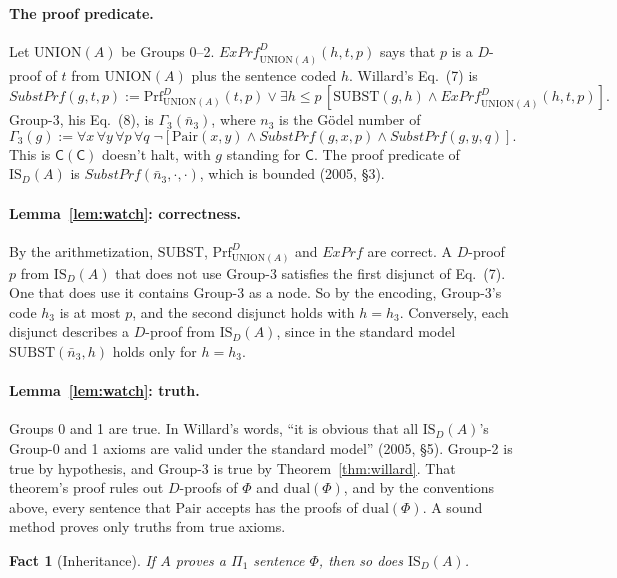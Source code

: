 \documentclass[11pt]{article}
\newcommand{\Prog}[1]{\mathsf{#1}}
\newcommand{\fs}[1]{\ifmmode\text{\guillemotleft#1\guillemotright}\else\guillemotleft#1\guillemotright\fi}
\newcommand{\Prf}{\mathrm{Prf}}
\newcommand{\Subst}{\mathrm{SUBST}}
\newcommand{\Pair}{\mathrm{Pair}}
\newcommand{\ISD}{\mathrm{IS}_D(A)}
\theoremstyle{plain}
\newtheorem{fact}[theorem]{Fact}
\theoremstyle{definition}
\begin{document}
\paragraph{The proof predicate.} Let $\mathrm{UNION}(A)$ be Groups 0--2.
$\mathit{ExPrf}^D_{\mathrm{UNION}(A)}(h,t,p)$ says that $p$ is a $D$-proof of
$t$ from $\mathrm{UNION}(A)$ plus the sentence coded $h$. Willard's Eq.~(7) is
\[
\mathit{SubstPrf}(g,t,p) := \Prf^D_{\mathrm{UNION}(A)}(t,p) \vee \exists h \le
p\,[\Subst(g,h) \wedge \mathit{ExPrf}^D_{\mathrm{UNION}(A)}(h,t,p)].
\]
Group-3, his Eq.~(8), is $\Gamma_3(\bar n_3)$, where $n_3$ is the Gödel number
of
\[
\Gamma_3(g) := \forall x\,\forall y\,\forall p\,\forall q\;\neg[\Pair(x,y)
\wedge \mathit{SubstPrf}(g,x,p) \wedge \mathit{SubstPrf}(g,y,q)].
\]
This is \fs{$\Prog{C}(\Prog{C})$ doesn't halt}, with $g$ standing for
$\Prog{C}$. The proof predicate of $\ISD$ is
$\mathit{SubstPrf}(\bar n_3, \cdot, \cdot)$, which is bounded (2005, \S3).

\paragraph{Lemma~\ref{lem:watch}: correctness.} By the arithmetization,
$\Subst$, $\Prf^D_{\mathrm{UNION}(A)}$ and $\mathit{ExPrf}$ are correct. A
$D$-proof $p$ from $\ISD$ that does not use Group-3 satisfies the first
disjunct of Eq.~(7). One that does use it contains Group-3 as a node. So by
the encoding, Group-3's code $h_3$ is at most $p$, and the second disjunct
holds with $h = h_3$. Conversely, each disjunct describes a $D$-proof from
$\ISD$, since in the standard model $\Subst(\bar n_3, h)$ holds only for
$h = h_3$.

\paragraph{Lemma~\ref{lem:watch}: truth.} Groups 0 and 1 are true. In
Willard's words, ``it is obvious that all $\mathrm{IS}_D(A)$'s Group-0 and 1
axioms are valid under the standard model'' (2005, \S5). Group-2 is true by
hypothesis, and Group-3 is true by Theorem~\ref{thm:willard}. That theorem's
proof rules out $D$-proofs of $\Phi$ and $\mathrm{dual}(\Phi)$, and by the
conventions above, every sentence that $\Pair$ accepts has the proofs of
$\mathrm{dual}(\Phi)$. A sound method proves only truths from true axioms.

\begin{fact}[Inheritance]\label{fact:detach}
If $A$ proves a $\Pi_1$ sentence $\Phi$, then so does $\ISD$.
\end{fact}
\end{document}
